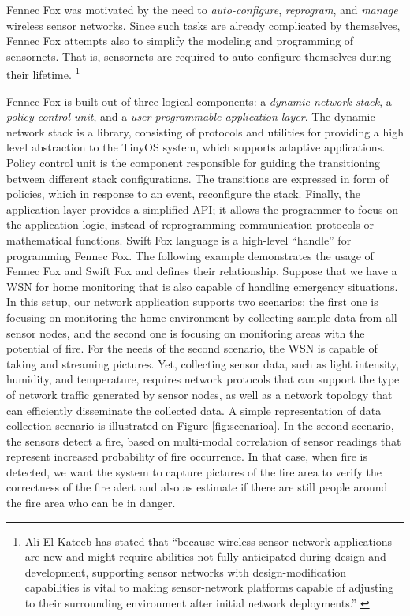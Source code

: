 Fennec Fox was motivated by the need to \textit{auto-configure},
\textit{reprogram}, and \textit{manage} wireless sensor networks. Since
such tasks are already complicated by themselves, Fennec Fox attempts also
to simplify the modeling and programming of sensornets. That is,
sensornets are required to auto-configure themselves during their lifetime.
\footnote{Ali El Kateeb has stated that ``because wireless sensor network
applications are new and might require abilities not fully anticipated
during design and development, supporting sensor networks with
design-modification capabilities is vital to making sensor-network
platforms capable of adjusting to their surrounding environment after
initial network deployments.'' \cite{kateeb:2009}}

Fennec Fox is built out of three logical components: 
a \textit{dynamic network stack}, a \textit{policy control unit}, and a
\textit{user programmable application layer}. The dynamic network stack is
a library, consisting of protocols and utilities for providing a high
level abstraction to the TinyOS \cite{hill:2000} system, which supports
adaptive applications. Policy control unit is the component responsible
for guiding the transitioning between different stack configurations. 
The transitions are expressed in form of policies, which in response to an
event, reconfigure the stack. Finally, the application layer provides a
simplified API; it allows the programmer to focus on the application logic,
instead of reprogramming communication protocols or mathematical functions.
Swift Fox language is a high-level ``handle'' for programming Fennec Fox.
The following example demonstrates the usage of Fennec Fox and Swift Fox
and defines their relationship. Suppose that we have a WSN for home
monitoring that is also capable of handling emergency situations. In this
setup, our network application supports two scenarios; the first one is
focusing on monitoring the home environment by collecting sample data
from all sensor nodes, and the second one is focusing on monitoring areas
with the potential of fire. For the needs of the second scenario, the WSN
is capable of taking and streaming pictures. Yet, collecting sensor data,
such as light intensity, humidity, and temperature, requires network
protocols that can support the type of network traffic generated by sensor 
nodes, as well as a network topology that can efficiently disseminate the
collected data. A simple representation of data collection scenario is
illustrated on Figure \ref{fig:scenarioa}. In the second scenario, the
sensors detect a fire, based on multi-modal correlation of sensor readings
that represent increased probability of fire occurrence. In that case, when
fire is detected, we want the system to capture pictures of the fire area
to verify the correctness of the fire alert and also as estimate if there
are still people around the fire area who can be in danger.

